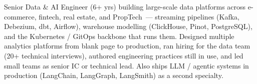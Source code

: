 

\begin{cvparagraph}
Senior Data \& AI Engineer (6+ yrs) building large-scale data platforms across e-commerce, fintech, real estate, and PropTech~--- streaming pipelines (Kafka, Debezium, dbt, Airflow), warehouse modelling (ClickHouse, Pinot, PostgreSQL), and the Kubernetes / GitOps backbone that runs them. Designed multiple analytics platforms from blank page to production, ran hiring for the data team (20+ technical interviews), authored engineering practices still in use, and led small teams as senior IC or technical lead. Also ships LLM / agentic systems in production (LangChain, LangGraph, LangSmith) as a second specialty.
\end{cvparagraph}
